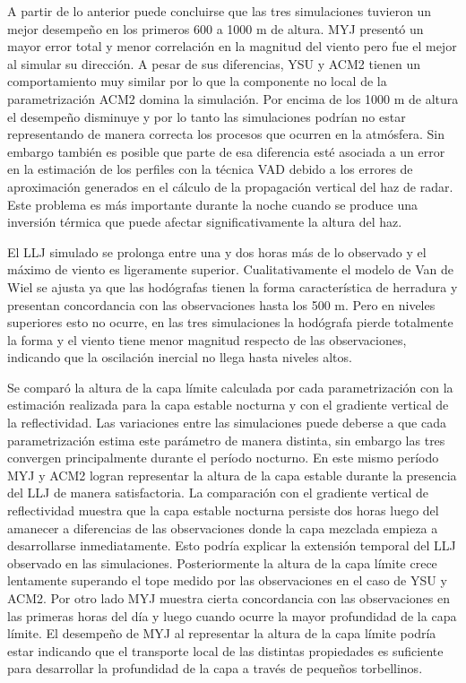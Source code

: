 \documentclass[12pt,spanish,oneside, a4paper]{book}
\begin{document}
A partir de lo anterior puede concluirse que las tres simulaciones
tuvieron un mejor desempeño en los primeros 600 a 1000 m de altura. MYJ
presentó un mayor error total y menor correlación en la magnitud del
viento pero fue el mejor al simular su dirección. A pesar de sus
diferencias, YSU y ACM2 tienen un comportamiento muy similar por lo que
la componente no local de la parametrización ACM2 domina la simulación.
Por encima de los 1000 m de altura el desempeño disminuye y por lo tanto
las simulaciones podrían no estar representando de manera correcta los
procesos que ocurren en la atmósfera. Sin embargo también es posible que
parte de esa diferencia esté asociada a un error en la estimación de los
perfiles con la técnica VAD debido a los errores de aproximación
generados en el cálculo de la propagación vertical del haz de radar.
Este problema es más importante durante la noche cuando se produce una
inversión térmica que puede afectar significativamente la altura del
haz.

El LLJ simulado se prolonga entre una y dos horas más de lo observado y
el máximo de viento es ligeramente superior. Cualitativamente el modelo
de Van de Wiel se ajusta ya que las hodógrafas tienen la forma
característica de herradura y presentan concordancia con las
observaciones hasta los 500 m. Pero en niveles superiores esto no
ocurre, en las tres simulaciones la hodógrafa pierde totalmente la forma
y el viento tiene menor magnitud respecto de las observaciones,
indicando que la oscilación inercial no llega hasta niveles altos.

Se comparó la altura de la capa límite calculada por cada
parametrización con la estimación realizada para la capa estable
nocturna y con el gradiente vertical de la reflectividad. Las
variaciones entre las simulaciones puede deberse a que cada
parametrización estima este parámetro de manera distinta, sin embargo
las tres convergen principalmente durante el período nocturno. En este
mismo período MYJ y ACM2 logran representar la altura de la capa estable
durante la presencia del LLJ de manera satisfactoria. La comparación con
el gradiente vertical de reflectividad muestra que la capa estable
nocturna persiste dos horas luego del amanecer a diferencias de las
observaciones donde la capa mezclada empieza a desarrollarse
inmediatamente. Esto podría explicar la extensión temporal del LLJ
observado en las simulaciones. Posteriormente la altura de la capa
límite crece lentamente superando el tope medido por las observaciones
en el caso de YSU y ACM2. Por otro lado MYJ muestra cierta concordancia
con las observaciones en las primeras horas del día y luego cuando
ocurre la mayor profundidad de la capa límite. El desempeño de MYJ al
representar la altura de la capa límite podría estar indicando que el
transporte local de las distintas propiedades es suficiente para
desarrollar la profundidad de la capa a través de pequeños torbellinos.
\end{document}

